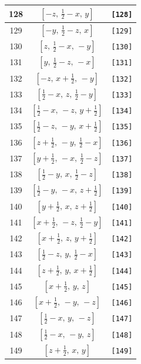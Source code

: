 \documentclass[fleqn,8pt]{jsarticle}
\begin{document}
\begin{longtable}{ccc}
128 & $\left[ - z,\, \frac{1}{2} - x,\, y \right]$ & {\tt [128]} \\ \hline
129 & $\left[ - y,\, \frac{1}{2} - z,\, x \right]$ & {\tt [129]} \\ \hline
130 & $\left[ z,\, \frac{1}{2} - x,\, - y \right]$ & {\tt [130]} \\ \hline
131 & $\left[ y,\, \frac{1}{2} - z,\, - x \right]$ & {\tt [131]} \\ \hline
132 & $\left[ - z,\, x + \frac{1}{2},\, - y \right]$ & {\tt [132]} \\ \hline
133 & $\left[ \frac{1}{2} - x,\, z,\, \frac{1}{2} - y \right]$ & {\tt [133]} \\ \hline
134 & $\left[ \frac{1}{2} - x,\, - z,\, y + \frac{1}{2} \right]$ & {\tt [134]} \\ \hline
135 & $\left[ \frac{1}{2} - z,\, - y,\, x + \frac{1}{2} \right]$ & {\tt [135]} \\ \hline
136 & $\left[ z + \frac{1}{2},\, - y,\, \frac{1}{2} - x \right]$ & {\tt [136]} \\ \hline
137 & $\left[ y + \frac{1}{2},\, - x,\, \frac{1}{2} - z \right]$ & {\tt [137]} \\ \hline
138 & $\left[ \frac{1}{2} - y,\, x,\, \frac{1}{2} - z \right]$ & {\tt [138]} \\ \hline
139 & $\left[ \frac{1}{2} - y,\, - x,\, z + \frac{1}{2} \right]$ & {\tt [139]} \\ \hline
140 & $\left[ y + \frac{1}{2},\, x,\, z + \frac{1}{2} \right]$ & {\tt [140]} \\ \hline
141 & $\left[ x + \frac{1}{2},\, - z,\, \frac{1}{2} - y \right]$ & {\tt [141]} \\ \hline
142 & $\left[ x + \frac{1}{2},\, z,\, y + \frac{1}{2} \right]$ & {\tt [142]} \\ \hline
143 & $\left[ \frac{1}{2} - z,\, y,\, \frac{1}{2} - x \right]$ & {\tt [143]} \\ \hline
144 & $\left[ z + \frac{1}{2},\, y,\, x + \frac{1}{2} \right]$ & {\tt [144]} \\ \hline
145 & $\left[ x + \frac{1}{2},\, y,\, z \right]$ & {\tt [145]} \\ \hline
146 & $\left[ x + \frac{1}{2},\, - y,\, - z \right]$ & {\tt [146]} \\ \hline
147 & $\left[ \frac{1}{2} - x,\, y,\, - z \right]$ & {\tt [147]} \\ \hline
148 & $\left[ \frac{1}{2} - x,\, - y,\, z \right]$ & {\tt [148]} \\ \hline
149 & $\left[ z + \frac{1}{2},\, x,\, y \right]$ & {\tt [149]} \\ \hline

\end{longtable}
\end{document}
